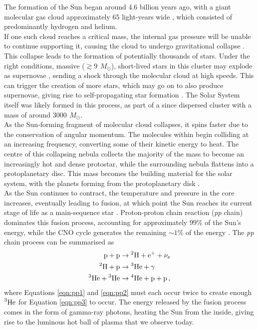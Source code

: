 \documentclass[11pt,a4paper,onecolumn]{report}
\newcommand*\chem[1]{\ensuremath{\mathrm{#1}}}
\begin{document}
The formation of the Sun began around 4.6 billion years ago, with a giant
molecular gas cloud approximately 65 light-years wide
\citep{montmerle_solar_2006}, which consisted of predominantly hydrogen and
helium. \\

If one such cloud reaches a critical mass, the internal gas pressure will be
unable to continue supporting it, causing the cloud to undergo gravitational
collapse \citep{jeans_stability_1902}. This collapse leads to the formation of
potentially thousands of stars. Under the right conditions, massive (\(\gtrsim
\SI{9}{\,M_\odot} \)), short-lived stars in this cluster may explode as
supernovae \citep{heger_how_2003}, sending a shock through the molecular cloud
at high speeds. This can trigger the creation of more stars, which may go on to
also produce supernovae, giving rise to self-propagating star formation
\citep{mueller_propagating_1976}. The Solar System itself was likely formed in
this process, as part of a since dispersed cluster with a mass of around
\(\SI{3000}{\,M_\odot} \)\citep{williams_astrophysical_2010,zwart_lost_2009}. \\

As the Sun-forming fragment of molecular cloud collapses, it spins faster due to
the conservation of angular momentum. The molecules within begin colliding at an
increasing frequency, converting some of their kinetic energy to heat. The
centre of this collapsing nebula collects the majority of the mass to become an
increasingly hot and dense protostar, while the surrounding nebula flattens into
a protoplanetary disc. This mass becomes the building material for the solar
system, with the planets forming from the protoplanetary disk
\citep{greaves_disks_2005}. \\

As the Sun continues to contract, the temperature and pressure in the core
increases, eventually leading to fusion, at which point the Sun reaches its
current stage of life as a main-sequence star \citep{woolfson_origin_2000}.
Proton-proton chain reaction (\textit{pp} chain) dominates this fusion process,
accounting for approximately $99\%$ of the Sun's energy, while the CNO cycle
generates the remaining \(\sim 1\%\) of the energy \citep{adelberger_solar_2011}.
The \textit{pp} chain process can be summarised as
\begin{align}
  \chem{p} + \chem{p} &\rightarrow \chem{\prescript{2}{}H} + \chem{e^+} +
  \nu_e \label{eqn:pp1}\\
  \chem{\prescript{2}{}H} + \chem{p} &\rightarrow \chem{\prescript{3}{}He}
  + \gamma \label{eqn:pp2}\\
  \chem{\prescript{3}{}He} + \chem{\prescript{3}{}He} & \rightarrow
  \chem{\prescript{4}{}He} + \chem{p} + \chem{p}\,, \label{eqn:pp3}
\end{align}
where Equations \ref{eqn:pp1} and \ref{eqn:pp2} must each occur twice to create
enough $\chem{\prescript{3}{}He}$ for Equation \ref{eqn:pp3} to occur. The
energy released by the fusion process comes in the form of gamma-ray photons,
heating the Sun from the inside, giving rise to the luminous hot ball of plasma
that we observe today. \\
\end{document}
